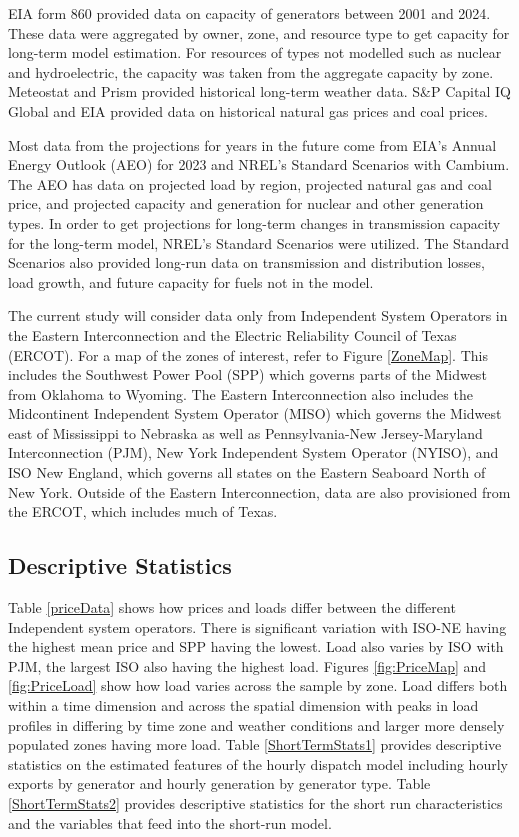 \documentclass[12pt]{article}
\begin{document}
EIA form 860 provided data on capacity of generators between 2001 and 2024. These data were aggregated by owner, zone, and resource type to get capacity for long-term model estimation. For resources of types not modelled such as nuclear and hydroelectric, the capacity was taken from the aggregate capacity by zone. Meteostat and Prism provided historical long-term weather data. S\&P Capital IQ Global and EIA provided data on historical natural gas prices and coal prices.

Most data from the projections for years in the future come from EIA's Annual Energy Outlook (AEO) for 2023 and NREL's Standard Scenarios with Cambium. The AEO has data on projected load by region, projected natural gas and coal price, and projected capacity and generation for nuclear and other generation types. In order to get projections for long-term changes in transmission capacity for the long-term model, NREL's Standard Scenarios were utilized. The Standard Scenarios also provided long-run data on transmission and distribution losses, load growth, and future capacity for fuels not in the model.

The current study will consider data only from Independent System Operators in the Eastern Interconnection and the Electric Reliability Council of Texas (ERCOT). For a map of the zones of interest, refer to Figure \ref{ZoneMap}. This includes the Southwest Power Pool (SPP) which governs parts of the Midwest from Oklahoma to Wyoming. The Eastern Interconnection also includes the Midcontinent Independent System Operator (MISO) which governs the Midwest east of Mississippi to Nebraska as well as Pennsylvania-New Jersey-Maryland Interconnection (PJM), New York Independent System Operator (NYISO), and ISO New England, which governs all states on the Eastern Seaboard North of New York. Outside of the Eastern Interconnection, data are also provisioned from the ERCOT, which includes much of Texas.

\subsection{Descriptive Statistics}

Table \ref{priceData} shows how prices and loads differ between the different Independent system operators. There is significant variation with ISO-NE having the highest mean price and SPP having the lowest. Load also varies by ISO with PJM, the largest ISO also having the highest load. Figures \ref{fig:PriceMap} and \ref{fig:PriceLoad} show how load varies across the sample by zone. Load differs both within a time dimension and across the spatial dimension with peaks in load profiles in differing by time zone and weather conditions and larger more densely populated zones having more load. Table \ref{ShortTermStats1} provides descriptive statistics on the estimated features of the hourly dispatch model including hourly exports by generator and hourly generation by generator type. Table \ref{ShortTermStats2} provides descriptive statistics for the short run characteristics and the variables that feed into the short-run model.
\end{document}
